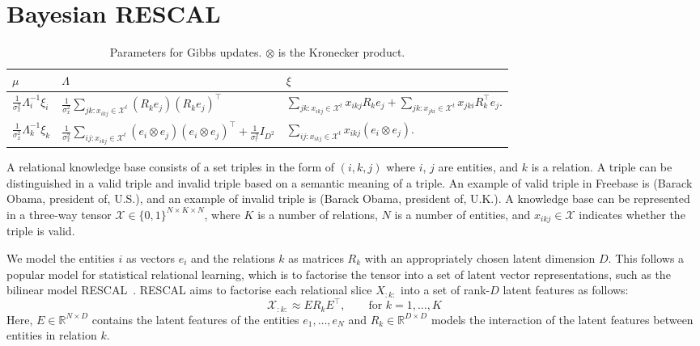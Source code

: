 \section{Bayesian RESCAL}
\label{sec:brescal}

\begin{table*}[bt]
\caption{Parameters for Gibbs updates. $\otimes$ is the Kronecker product.}
\label{tab:brescalposterior}
\vskip 0.05in
\begin{tabu}{l|l|l}
$\mu$&$\Lambda$&$\xi$\\
\hline
$\frac{1}{\sigma_x^2}\Lambda_i^{-1}\xi_i$&
$\frac{1}{\sigma_x^2} \sum_{jk : x_{ikj} \in \mathcal{X}^{t}} (R_k e_j)(R_k e_j)^\top$&
$\sum_{jk : x_{ikj} \in \mathcal{X}^{t}}  x_{ikj} R_{k} e_{j} +
\sum_{jk : x_{jki} \in \mathcal{X}^{t}} x_{jki} R_{k}^\top e_{j}.$
\\
$\frac{1}{\sigma_x^2}\Lambda_k^{-1}\xi_k$&
$\frac{1}{\sigma_x^2} \sum_{ij:x_{ikj} \in \mathcal{X}^{t}} (e_i
\otimes e_j)(e_i \otimes e_j)^\top + \frac{1}{\sigma_r^2} {I}_{D^2}$&
$\sum_{ij:x_{ikj} \in \mathcal{X}^{t}} x_{ikj} (e_{i} \otimes e_{j}).$
\end{tabu}
\end{table*}


A relational knowledge base consists of a set triples in the form of $(i, k, j)$
where $i$, $j$ are entities, and $k$ is a relation. A triple can be distinguished
in a valid triple and invalid triple based on a semantic meaning of a triple. An
example of valid triple in Freebase is (Barack Obama, president of, U.S.), and an
example of invalid triple is (Barack Obama, president of, U.K.).
A knowledge base can be represented in a three-way tensor
$\mathcal{X} \in \{0, 1\}^{N \times K \times N}$, where $K$ is a number of
relations, $N$ is a number of entities, and $x_{ikj}\in\mathcal{X}$ indicates whether
the triple is valid.

We model the entities $i$ as vectors $e_i$ and the relations $k$ as matrices $R_k$ with an
appropriately chosen latent dimension $D$. This follows a popular model
for statistical relational learning, which is to factorise the tensor into a
set of latent vector representations, such as the bilinear model RESCAL~\cite{nickel2011three}.
RESCAL aims to factorise each relational slice $X_{:k:}$ into a set of rank-$D$ latent
features as follows:
\[
  \mathcal{X}_{:k:} \approx E R_k E^\top, \qquad \text{for } k = 1, \dots, K
\]
Here, $E\in {\mathbb R}^{N \times D}$ contains the latent features of the
entities $e_1, \ldots, e_N$ and $R_k\in {\mathbb R}^{D \times D}$ models the interaction of the
latent features between entities in relation $k$.

